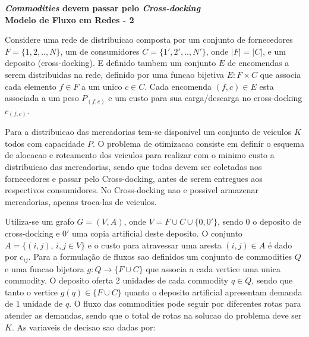 \documentclass[12pt]{article}
\begin{document}
\begin{center}
\textbf{\textit{Commodities} devem passar pelo \emph{Cross-docking}} \\
\textbf{Modelo de Fluxo em Redes - 2} \\
\end{center}
\vspace{0.4cm}
\noindent Considere uma rede de distribuicao composta por um conjunto de fornecedores $F=\{1,2,..,N\}$, um de consumidores $C=\{1',2',..,N'\}$, onde $|F|=|C|$, e um deposito (cross-docking). E definido tambem um conjunto $E$ de encomendas a serem distribuidas na rede, definido por uma funcao bijetiva $E:F \times C$ que associa cada elemento $f \in F$ a um unico $c \in C$. Cada encomenda $(f,c) \in E$ esta associada a um peso $P_{(f,c)}$ e um custo para sua carga/descarga no cross-docking $c_{(f,c)}$.

\vspace{0.2cm}
Para a distribuicao das mercadorias tem-se disponivel um conjunto de veiculos $K$ todos com capacidade $P$. O problema de otimizacao consiste em definir o esquema de alocacao e roteamento dos veiculos para realizar com o minimo custo a distribuicao das mercadorias, sendo que todas devem ser coletadas nos fornecedores e passar pelo Cross-docking, antes de serem entregues aos respectivos consumidores. No Cross-docking nao e possivel armazenar mercadorias, apenas troca-las de veiculos.

\vspace{0.2cm}
Utiliza-se um grafo $G=(V,A)$, onde $V = F \cup C \cup \{0,0'\}$, sendo $0$ o deposito de cross-docking e $0'$ uma copia artificial deste deposito. O conjunto $A=\{(i,j), \, i,j \in V\}$ e o custo para atravessar uma aresta $(i,j) \in A$ \'e dado por $c_{ij}$. Para a formula\c{c}\~ao de fluxos sao definidos um conjunto de commodities $Q$ e uma funcao bijetora $g: Q \rightarrow \{F \cup C \}$ que associa a cada vertice uma unica commodity. O deposito oferta 2 unidades de cada commodity $q \in Q$, sendo que tanto o vertice $g(q) \in \{F \cup C \}$ quanto o deposito artificial apresentam demanda de 1 unidade de $q$. O fluxo das commodities pode seguir por diferentes rotas para atender as demandas, sendo que o total de rotas na solucao do problema deve ser $K$. As variaveis de decisao sao dadas por:
\end{document}
